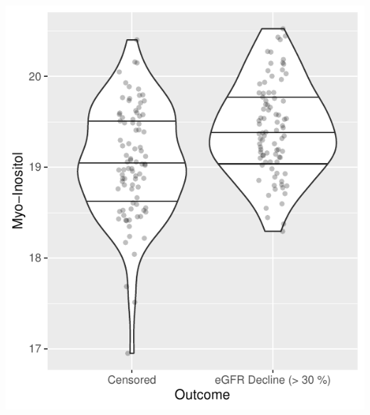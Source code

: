 \documentclass[]{article}
\begin{document}
\includegraphics{0033_PROFIL--Metabolomics_files/figure-latex/Boxplots-Myo-I-1.pdf}
\end{document}
